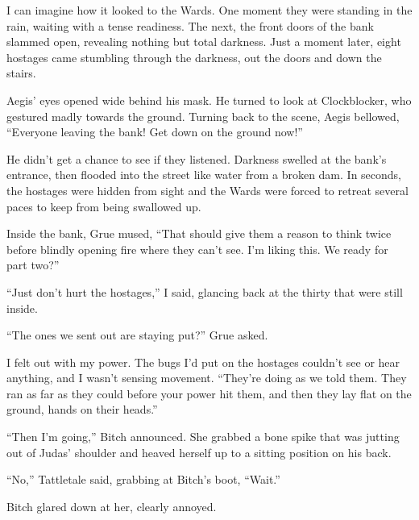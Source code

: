 





I can imagine how it looked to the Wards.  One moment they were standing in the rain, waiting with a tense readiness.  The next, the front doors of the bank slammed open, revealing nothing but total darkness.  Just a moment later, eight hostages came stumbling through the darkness, out the doors and down the stairs.



Aegis' eyes opened wide behind his mask.  He turned to look at Clockblocker, who gestured madly towards the ground.  Turning back to the scene, Aegis bellowed, ``Everyone leaving the bank!  Get down on the ground now!''



He didn't get a chance to see if they listened.  Darkness swelled at the bank's entrance, then flooded into the street like water from a broken dam.  In seconds, the hostages were hidden from sight and the Wards were forced to retreat several paces to keep from being swallowed up.



Inside the bank, Grue mused, ``That should give them a reason to think twice before blindly opening fire where they can't see.  I'm liking this.  We ready for part two?''



``Just don't hurt the hostages,'' I said, glancing back at the thirty that were still inside.



``The ones we sent out are staying put?'' Grue asked.



I felt out with my power.  The bugs I'd put on the hostages couldn't see or hear anything, and I wasn't sensing movement.  ``They're doing as we told them.  They ran as far as they could before your power hit them, and then they lay flat on the ground, hands on their heads.''



``Then I'm going,'' Bitch announced.  She grabbed a bone spike that was jutting out of Judas' shoulder and heaved herself up to a sitting position on his back.



``No,'' Tattletale said, grabbing at Bitch's boot, ``Wait.''



Bitch glared down at her, clearly annoyed.



